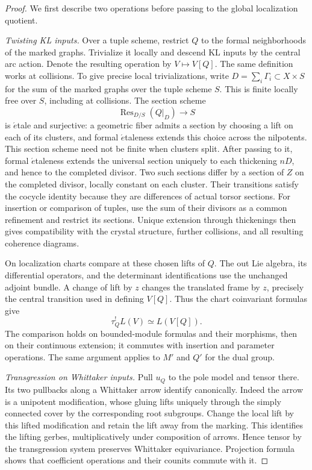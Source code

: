 \documentclass[11pt]{article}
\numberwithin{equation}{section}
\theoremstyle{definition}
\theoremstyle{remark}
\begin{document}
\begin{proof}
We first describe two operations before passing to the global
localization quotient.

\emph{Twisting KL inputs.}
Over a tuple scheme, restrict \(Q\) to the formal neighborhoods of
the marked graphs.  Trivialize it locally and descend KL inputs by the
central arc action.  Denote the resulting operation by \(V\mapsto
V[Q]\).  The same definition works at collisions.  To give precise local
trivializations, write \(D=\sum_i\Gamma_i\subset X\times S\)
for the sum of the marked graphs over the tuple scheme \(S\).
This is finite locally free over \(S\), including at collisions.
The section scheme
\[
 \operatorname{Res}_{D/S}(Q|_D)\longrightarrow S
\]
is \(\acute{e}\)tale and surjective: a geometric fiber admits a
section by choosing a lift on each of its clusters, and formal
\(\acute{e}\)taleness extends this choice across the nilpotents.
This section scheme need not be finite when clusters split.
After passing to it, formal \(\acute{e}\)taleness extends the
universal section uniquely to each thickening \(nD\), and hence
to the completed divisor.  Two such sections differ by a section
of \(Z\) on the completed divisor, locally constant on each
cluster.  Their transitions satisfy the cocycle identity because
they are differences of actual torsor sections.  For insertion or
comparison of tuples, use the sum of their divisors as a common
refinement and restrict its sections.  Unique extension through
thickenings then gives compatibility with the crystal structure,
further collisions, and all resulting coherence diagrams.

On localization charts compare at these chosen lifts of \(Q\).
The out Lie algebra, its differential operators, and the determinant
identifications use the unchanged adjoint bundle.  A change of lift
by \(z\) changes the translated frame by \(z\), precisely the
central transition used in defining \(V[Q]\).  Thus the chart
coinvariant formulas give
\[
 \tau_Q^!L(V)\simeq L(V[Q]).
\]
The comparison holds on bounded-module formulas and their morphisms,
then on their continuous extension; it commutes with insertion and
parameter operations.  The same argument applies to \(M'\) and
\(Q'\) for the dual group.

\emph{Transgression on Whittaker inputs.}
Pull \(u_Q\) to the pole model and tensor there.  Its two pullbacks
along a Whittaker arrow identify canonically.  Indeed the arrow is a
unipotent modification, whose gluing lifts uniquely through the
simply connected cover by the corresponding root subgroups.  Change
the local lift by this lifted modification and retain the lift away
from the marking.  This identifies the lifting gerbes, multiplicatively
under composition of arrows.  Hence tensor by the transgression
system preserves Whittaker equivariance.  Projection formula shows
that coefficient operations and their counits commute with it.


\end{proof}
\end{document}
